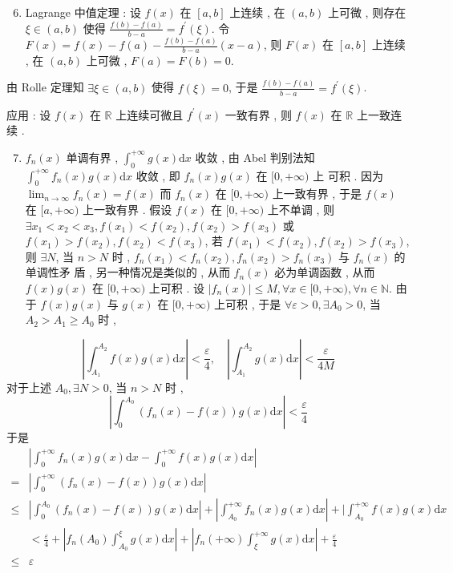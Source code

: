 \documentclass[10pt]{article}
\begin{document}
\begin{enumerate}
  \setcounter{enumi}{5}
  \item Lagrange  中值定理  :  设  $f(x)$  在  $[a, b]$  上连续 ,  在  $(a, b)$  上可微 ,  则存在  $\xi \in(a, b)$  使得  $\frac{f(b)-f(a)}{b-a}=f^{\prime}(\xi)$.  令  $F(x)=f(x)-f(a)-\frac{f(b)-f(a)}{b-a}(x-a)$,  则  $F(x)$  在  $[a, b]$  上连续 ,  在  $(a, b)$  上可微 , $F(a)=F(b)=0$.
\end{enumerate}
 由  Rolle  定理知  $\exists \xi \in(a, b)$  使得  $f(\xi)=0$,  于是  $\frac{f(b)-f(a)}{b-a}=f^{\prime}(\xi)$.

 应用 :  设  $f(x)$  在  $\mathbb{R}$  上连续可微且  $f^{\prime}(x)$  一致有界 ,  则  $f(x)$  在  $\mathbb{R}$  上一致连续 .

\begin{enumerate}
  \setcounter{enumi}{6}
  \item $f_{n}(x)$  单调有界 , $\int_{0}^{+\infty} g(x) \mathrm{d} x$  收敛 ,  由  Abel  判别法知  $\int_{0}^{+\infty} f_{n}(x) g(x) \mathrm{d} x$  收敛 ,  即  $f_{n}(x) g(x)$  在  $[0,+\infty)$  上   可积 .  因为  $\lim _{n \rightarrow \infty} f_{n}(x)=f(x)$  而  $f_{n}(x)$  在  $[0,+\infty)$  上一致有界 ,  于是  $f(x)$  在  $[a,+\infty)$  上一致有界 .  假设  $f(x)$  在  $[0,+\infty)$  上不单调 ,  则  $\exists x_{1}<x_{2}<x_{3}, f\left(x_{1}\right)<f\left(x_{2}\right), f\left(x_{2}\right)>f\left(x_{3}\right)$  或  $f\left(x_{1}\right)>f\left(x_{2}\right), f\left(x_{2}\right)<f\left(x_{3}\right)$,  若  $f\left(x_{1}\right)<f\left(x_{2}\right), f\left(x_{2}\right)>f\left(x_{3}\right)$,  则  $\exists N$,  当  $n>N$  时 , $f_{n}\left(x_{1}\right)<f_{n}\left(x_{2}\right), f_{n}\left(x_{2}\right)>f_{n}\left(x_{3}\right)$  与  $f_{n}(x)$  的单调性矛   盾 ,  另一种情况是类似的 ,  从而  $f_{n}(x)$  必为单调函数 ,  从而  $f(x) g(x)$  在  $[0,+\infty)$  上可积 .  设  $\left|f_{n}(x)\right| \leqslant M, \forall x \in[0,+\infty), \forall n \in \mathbb{N}$.  由于  $f(x) g(x)$  与  $g(x)$  在  $[0,+\infty)$  上可积 ,  于是  $\forall \varepsilon>0, \exists A_{0}>0$,  当  $A_{2}>A_{1} \geqslant A_{0}$  时 ,
\end{enumerate}
$$
\left|\int_{A_{1}}^{A_{2}} f(x) g(x) \mathrm{d} x\right|<\frac{\varepsilon}{4}, \quad\left|\int_{A_{1}}^{A_{2}} g(x) \mathrm{d} x\right|<\frac{\varepsilon}{4 M}
$$
 对于上述  $A_{0}, \exists N>0$,  当  $n>N$  时 ,
$$
\left|\int_{0}^{A_{0}}\left(f_{n}(x)-f(x)\right) g(x) \mathrm{d} x\right|<\frac{\varepsilon}{4}
$$
 于是 
$$
\begin{aligned}
&\left|\int_{0}^{+\infty} f_{n}(x) g(x) \mathrm{d} x-\int_{0}^{+\infty} f(x) g(x) \mathrm{d} x\right| \\
=&\left|\int_{0}^{+\infty}\left(f_{n}(x)-f(x)\right) g(x) \mathrm{d} x\right| \\
\leqslant &\left|\int_{0}^{A_{0}}\left(f_{n}(x)-f(x)\right) g(x) \mathrm{d} x\right|+\left|\int_{A_{0}}^{+\infty} f_{n}(x) g(x) \mathrm{d} x\right|+\mid \int_{A_{0}}^{+\infty} f(x) g(x) \mathrm{d} x \\
&<\frac{\varepsilon}{4}+\left|f_{n}\left(A_{0}\right) \int_{A_{0}}^{\xi} g(x) \mathrm{d} x\right|+\left|f_{n}(+\infty) \int_{\xi}^{+\infty} g(x) \mathrm{d} x\right|+\frac{\varepsilon}{4} \\
\leqslant & \varepsilon
\end{aligned}
$$
\end{document}
